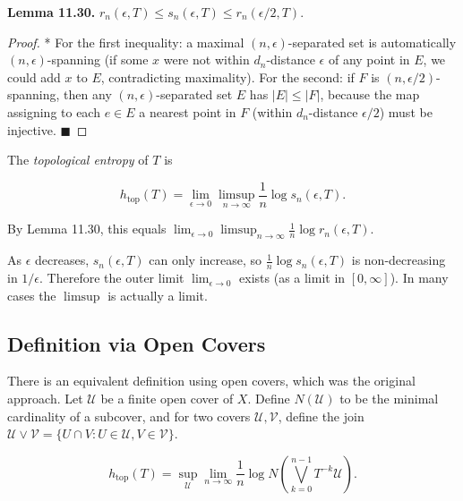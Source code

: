 \textbf{Lemma 11.30.} $r_n(\epsilon, T) \leq s_n(\epsilon, T) \leq r_n(\epsilon/2, T)$.

\begin{proof}
* For the first inequality: a maximal $(n,\epsilon)$-separated set is automatically $(n,\epsilon)$-spanning (if some $x$ were not within $d_n$-distance $\epsilon$ of any point in $E$, we could add $x$ to $E$, contradicting maximality). For the second: if $F$ is $(n, \epsilon/2)$-spanning, then any $(n, \epsilon)$-separated set $E$ has $|E| \leq |F|$, because the map assigning to each $e \in E$ a nearest point in $F$ (within $d_n$-distance $\epsilon/2$) must be injective. $\blacksquare$

\end{proof}

\begin{definition}\label{def:11.31}
The \textit{topological entropy} of $T$ is

\[
h_{\mathrm{top}}(T) = \lim_{\epsilon \to 0} \limsup_{n \to \infty} \frac{1}{n} \log s_n(\epsilon, T).
\]

By Lemma 11.30, this equals $\lim_{\epsilon \to 0} \limsup_{n \to \infty} \frac{1}{n}\log r_n(\epsilon, T)$.
\end{definition}


\begin{remark}
As $\epsilon$ decreases, $s_n(\epsilon, T)$ can only increase, so $\frac{1}{n}\log s_n(\epsilon, T)$ is non-decreasing in $1/\epsilon$. Therefore the outer limit $\lim_{\epsilon \to 0}$ exists (as a limit in $[0, \infty]$). In many cases the $\limsup$ is actually a limit.
\end{remark}


\subsection{Definition via Open Covers}\label{sec:11.7.2}

There is an equivalent definition using open covers, which was the original approach. Let $\mathcal{U}$ be a finite open cover of $X$. Define $N(\mathcal{U})$ to be the minimal cardinality of a subcover, and for two covers $\mathcal{U}, \mathcal{V}$, define the join $\mathcal{U} \vee \mathcal{V} = \{U \cap V : U \in \mathcal{U}, V \in \mathcal{V}\}$.

\[
h_{\mathrm{top}}(T) = \sup_{\mathcal{U}} \lim_{n \to \infty} \frac{1}{n} \log N\!\left(\bigvee_{k=0}^{n-1} T^{-k}\mathcal{U}\right).
\]

